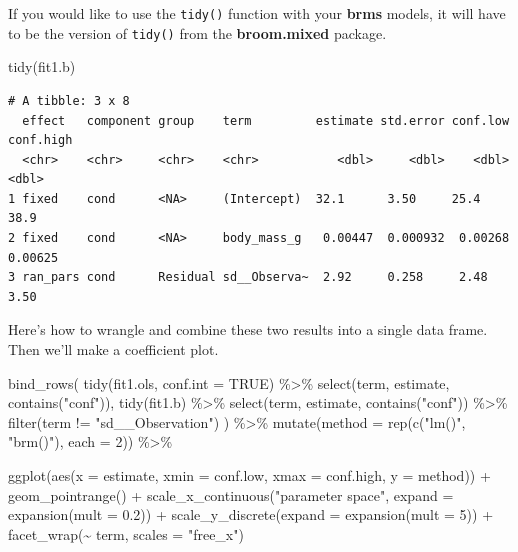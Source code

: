 \documentclass[
  letterpaper,
  DIV=11,
  numbers=noendperiod]{scrartcl}
\newenvironment{Shaded}{\begin{snugshade}}{\end{snugshade}}
\newcommand{\AttributeTok}[1]{\textcolor[rgb]{0.40,0.45,0.13}{#1}}
\newcommand{\ConstantTok}[1]{\textcolor[rgb]{0.56,0.35,0.01}{#1}}
\newcommand{\DecValTok}[1]{\textcolor[rgb]{0.68,0.00,0.00}{#1}}
\newcommand{\FloatTok}[1]{\textcolor[rgb]{0.68,0.00,0.00}{#1}}
\newcommand{\FunctionTok}[1]{\textcolor[rgb]{0.28,0.35,0.67}{#1}}
\newcommand{\NormalTok}[1]{\textcolor[rgb]{0.00,0.23,0.31}{#1}}
\newcommand{\SpecialCharTok}[1]{\textcolor[rgb]{0.37,0.37,0.37}{#1}}
\newcommand{\StringTok}[1]{\textcolor[rgb]{0.13,0.47,0.30}{#1}}
\begin{document}
If you would like to use the \texttt{tidy()} function with your
\textbf{brms} models, it will have to be the version of \texttt{tidy()}
from the \textbf{broom.mixed} package.

\begin{Shaded}
\begin{Highlighting}[]
\FunctionTok{tidy}\NormalTok{(fit1.b)}
\end{Highlighting}
\end{Shaded}

\begin{verbatim}
# A tibble: 3 x 8
  effect   component group    term         estimate std.error conf.low conf.high
  <chr>    <chr>     <chr>    <chr>           <dbl>     <dbl>    <dbl>     <dbl>
1 fixed    cond      <NA>     (Intercept)  32.1      3.50     25.4      38.9    
2 fixed    cond      <NA>     body_mass_g   0.00447  0.000932  0.00268   0.00625
3 ran_pars cond      Residual sd__Observa~  2.92     0.258     2.48      3.50   
\end{verbatim}

Here's how to wrangle and combine these two results into a single data
frame. Then we'll make a coefficient plot.

\begin{Shaded}
\begin{Highlighting}[]
\FunctionTok{bind\_rows}\NormalTok{(}
  \FunctionTok{tidy}\NormalTok{(fit1.ols, }\AttributeTok{conf.int =} \ConstantTok{TRUE}\NormalTok{) }\SpecialCharTok{\%\textgreater{}\%} \FunctionTok{select}\NormalTok{(term, estimate, }\FunctionTok{contains}\NormalTok{(}\StringTok{"conf"}\NormalTok{)),}
  \FunctionTok{tidy}\NormalTok{(fit1.b) }\SpecialCharTok{\%\textgreater{}\%} \FunctionTok{select}\NormalTok{(term, estimate, }\FunctionTok{contains}\NormalTok{(}\StringTok{"conf"}\NormalTok{)) }\SpecialCharTok{\%\textgreater{}\%} \FunctionTok{filter}\NormalTok{(term }\SpecialCharTok{!=} \StringTok{"sd\_\_Observation"}\NormalTok{)}
\NormalTok{) }\SpecialCharTok{\%\textgreater{}\%} 
  \FunctionTok{mutate}\NormalTok{(}\AttributeTok{method =} \FunctionTok{rep}\NormalTok{(}\FunctionTok{c}\NormalTok{(}\StringTok{"lm()"}\NormalTok{, }\StringTok{"brm()"}\NormalTok{), }\AttributeTok{each =} \DecValTok{2}\NormalTok{)) }\SpecialCharTok{\%\textgreater{}\%} 
  
  \FunctionTok{ggplot}\NormalTok{(}\FunctionTok{aes}\NormalTok{(}\AttributeTok{x =}\NormalTok{ estimate, }\AttributeTok{xmin =}\NormalTok{ conf.low, }\AttributeTok{xmax =}\NormalTok{ conf.high, }\AttributeTok{y =}\NormalTok{ method)) }\SpecialCharTok{+}
  \FunctionTok{geom\_pointrange}\NormalTok{() }\SpecialCharTok{+}
  \FunctionTok{scale\_x\_continuous}\NormalTok{(}\StringTok{"parameter space"}\NormalTok{, }\AttributeTok{expand =} \FunctionTok{expansion}\NormalTok{(}\AttributeTok{mult =} \FloatTok{0.2}\NormalTok{)) }\SpecialCharTok{+}
  \FunctionTok{scale\_y\_discrete}\NormalTok{(}\AttributeTok{expand =} \FunctionTok{expansion}\NormalTok{(}\AttributeTok{mult =} \DecValTok{5}\NormalTok{)) }\SpecialCharTok{+}
  \FunctionTok{facet\_wrap}\NormalTok{(}\SpecialCharTok{\textasciitilde{}}\NormalTok{ term, }\AttributeTok{scales =} \StringTok{"free\_x"}\NormalTok{)}
\end{Highlighting}
\end{Shaded}
\end{document}
